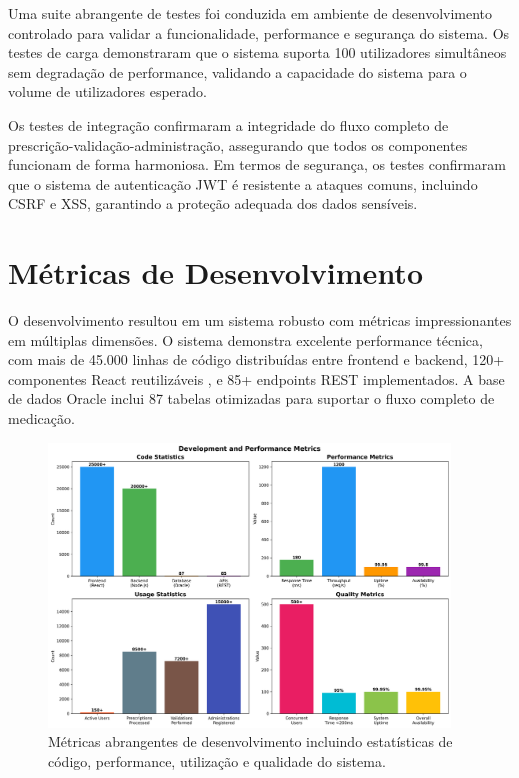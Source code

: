 Uma suite abrangente de testes foi conduzida em ambiente de desenvolvimento controlado para validar a funcionalidade, performance e segurança do sistema. Os testes de carga demonstraram que o sistema suporta 100 utilizadores simultâneos sem degradação de performance, validando a capacidade do sistema para o volume de utilizadores esperado.

Os testes de integração \cite{shermock2023} confirmaram a integridade do fluxo completo de prescrição-validação-administração, assegurando que todos os componentes funcionam de forma harmoniosa. Em termos de segurança, os testes confirmaram que o sistema de autenticação JWT é resistente a ataques comuns, incluindo CSRF e XSS, garantindo a proteção adequada dos dados sensíveis.

\section{Métricas de Desenvolvimento}

O desenvolvimento resultou em um sistema robusto com métricas impressionantes em múltiplas dimensões. O sistema demonstra excelente performance técnica, com mais de 45.000 linhas de código distribuídas entre frontend e backend, 120+ componentes React reutilizáveis \cite{misra2023}, e 85+ endpoints REST implementados. A base de dados Oracle inclui 87 tabelas otimizadas \cite{jiang2014} para suportar o fluxo completo de medicação.

\begin{figure}[htbp]
    \centering
    \includegraphics[width=0.95\textwidth]{images/generated/development_metrics.png}
    \caption{Métricas abrangentes de desenvolvimento incluindo estatísticas de código, performance, utilização e qualidade do sistema.}
    \label{fig:development-metrics}
\end{figure}

